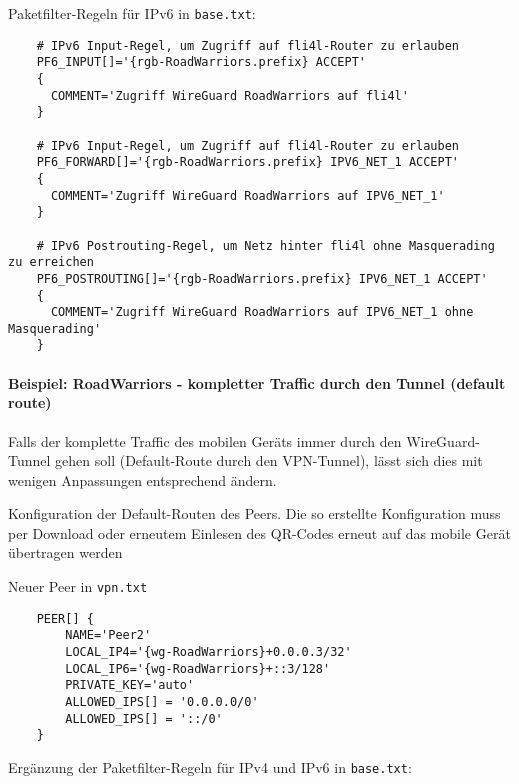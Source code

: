 Paketfilter-Regeln für IPv6 in \verb+base.txt+:

\begin{example}
\begin{verbatim}
    # IPv6 Input-Regel, um Zugriff auf fli4l-Router zu erlauben
    PF6_INPUT[]='{rgb-RoadWarriors.prefix} ACCEPT'
    {
      COMMENT='Zugriff WireGuard RoadWarriors auf fli4l'
    }
    
    # IPv6 Input-Regel, um Zugriff auf fli4l-Router zu erlauben
    PF6_FORWARD[]='{rgb-RoadWarriors.prefix} IPV6_NET_1 ACCEPT'
    {
      COMMENT='Zugriff WireGuard RoadWarriors auf IPV6_NET_1'
    }
    
    # IPv6 Postrouting-Regel, um Netz hinter fli4l ohne Masquerading zu erreichen
    PF6_POSTROUTING[]='{rgb-RoadWarriors.prefix} IPV6_NET_1 ACCEPT'
    {
      COMMENT='Zugriff WireGuard RoadWarriors auf IPV6_NET_1 ohne Masquerading'
    }
\end{verbatim}
\end{example}


\paragraph{Beispiel: RoadWarriors - kompletter Traffic durch den Tunnel (default route)}

\noindent

Falls der komplette Traffic des mobilen Geräts immer durch den WireGuard-Tunnel 
gehen soll (Default-Route durch den VPN-Tunnel), lässt sich dies  mit wenigen 
Anpassungen entsprechend ändern.

Konfiguration der Default-Routen des Peers. Die so erstellte Konfiguration muss 
per Download oder erneutem Einlesen des QR-Codes erneut auf das mobile Gerät 
übertragen werden

Neuer Peer in \verb+vpn.txt+

\begin{example}
\begin{verbatim}
    PEER[] {
        NAME='Peer2'
        LOCAL_IP4='{wg-RoadWarriors}+0.0.0.3/32'
        LOCAL_IP6='{wg-RoadWarriors}+::3/128'
        PRIVATE_KEY='auto'
        ALLOWED_IPS[] = '0.0.0.0/0'
        ALLOWED_IPS[] = '::/0'
    }
\end{verbatim}
\end{example}


Ergänzung der Paketfilter-Regeln für IPv4 und IPv6 in \verb+base.txt+:

